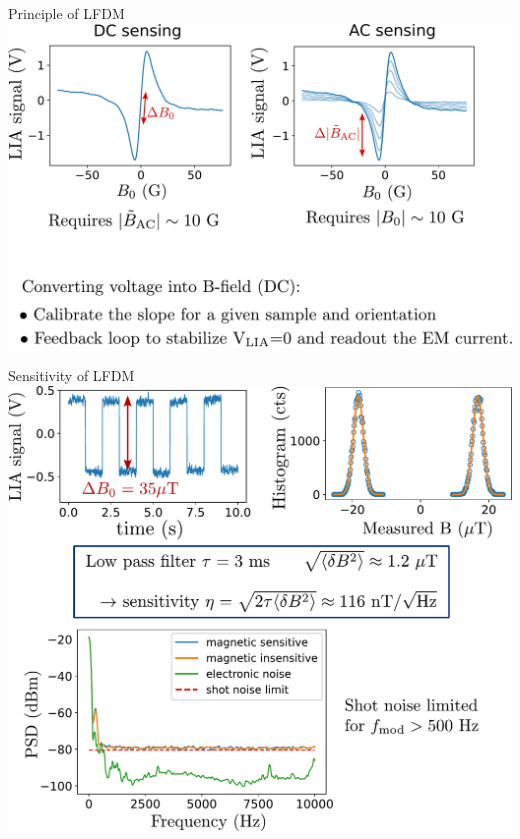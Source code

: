 \documentclass{beamer}
\begin{document}
\begin{frame}{Principle of LFDM}
\centering
\includegraphics[width=\textwidth,height=0.9\textheight,keepaspectratio]{Slide_mesure_LFDM}
\end{frame}


\begin{frame}{Sensitivity of LFDM}
\centering
\includegraphics[width=\textwidth,height=0.9\textheight,keepaspectratio]{Slide_sensi_LFDM}
\end{frame}
\end{document}
